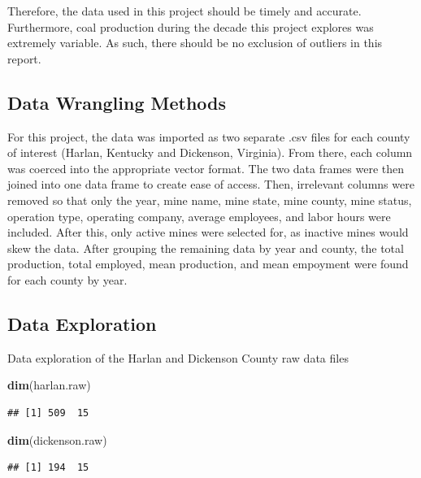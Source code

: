 \documentclass[12pt,]{article}
\newenvironment{Shaded}{\begin{snugshade}}{\end{snugshade}}
\newcommand{\KeywordTok}[1]{\textcolor[rgb]{0.13,0.29,0.53}{\textbf{#1}}}
\newcommand{\NormalTok}[1]{#1}
\begin{document}
Therefore, the data used in this project should be timely and accurate.
Furthermore, coal production during the decade this project explores was
extremely variable. As such, there should be no exclusion of outliers in
this report.

\hypertarget{data-wrangling-methods}{%
\subsection{Data Wrangling Methods}\label{data-wrangling-methods}}

For this project, the data was imported as two separate .csv files for
each county of interest (Harlan, Kentucky and Dickenson, Virginia). From
there, each column was coerced into the appropriate vector format. The
two data frames were then joined into one data frame to create ease of
access. Then, irrelevant columns were removed so that only the year,
mine name, mine state, mine county, mine status, operation type,
operating company, average employees, and labor hours were included.
After this, only active mines were selected for, as inactive mines would
skew the data. After grouping the remaining data by year and county, the
total production, total employed, mean production, and mean empoyment
were found for each county by year.

\hypertarget{data-exploration}{%
\subsection{Data Exploration}\label{data-exploration}}

Data exploration of the Harlan and Dickenson County raw data files

\begin{Shaded}
\begin{Highlighting}[]
\KeywordTok{dim}\NormalTok{(harlan.raw)}
\end{Highlighting}
\end{Shaded}

\begin{verbatim}
## [1] 509  15
\end{verbatim}

\begin{Shaded}
\begin{Highlighting}[]
\KeywordTok{dim}\NormalTok{(dickenson.raw)}
\end{Highlighting}
\end{Shaded}

\begin{verbatim}
## [1] 194  15
\end{verbatim}
\end{document}
